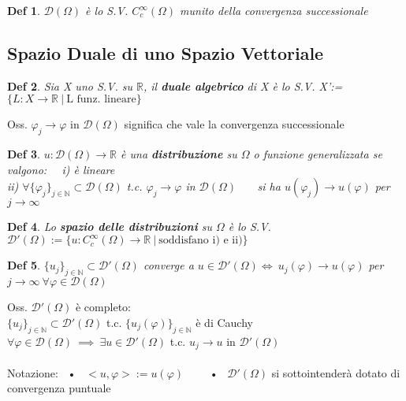 \documentclass{article}
\theoremstyle{unnumbered}
\newtheorem* {theoremT}{Def}
\theoremstyle{unnumbered1}
\newenvironment{defi}{\begin{gBox}\begin{theoremT}}{\end{theoremT}\end{gBox}}
\renewcommand{\phi}{\varphi}
\begin{document}
\begin{defi}
$\mathcal{D}(\Omega)$ è lo S.V. $C^{\infty}_c(\Omega)$ munito della convergenza successionale
\end{defi}
\vspace{0.2cm}

\subsection{Spazio Duale di uno Spazio Vettoriale}

\begin{defi}
Sia X uno S.V. su $\mathbb{R}$, il \textbf{duale algebrico} di X è lo S.V. X':=$\{ L:X\to \mathbb{R} \ |\ \text{L funz. lineare} \}$ 
\end{defi}
%
Oss. $\phi_j\to\phi$ in $\mathcal{D}(\Omega)$ significa che vale la convergenza successionale 

\begin{defi}
$u:\mathcal{D}(\Omega)\to\mathbb{R}$ è una \textbf{distribuzione} su $\Omega$ o funzione generalizzata se valgono: \ \ i) è lineare\\
ii) $\forall \{\phi_j\}_{j\in\mathbb{N}}\subset\mathcal{D}(\Omega)$ t.c. $\phi_j\to\phi$ in $\mathcal{D}(\Omega)$ \ \ \ si ha $u(\phi_j)\to u(\phi)$ per $j\to\infty$
\end{defi}

\begin{defi}
Lo \textbf{spazio delle distribuzioni} su $\Omega$ è lo S.V. \ $\mathcal{D}'(\Omega):=\{u: C^{\infty}_c(\Omega)\to\mathbb{R} \ | \ \text{soddisfano i) e ii)}\}$
\end{defi}

\begin{defi}
$\{u_j\}_{j\in\mathbb{N}}\subset\mathcal{D}'(\Omega)$ converge a $u\in\mathcal{D}'(\Omega) \Longleftrightarrow \ u_j(\phi)\to u(\phi)$ per $j\to\infty \ \forall \phi \in \mathcal{D}(\Omega)$   
\end{defi}
%
Oss. $\mathcal{D}'(\Omega)$ è completo: \\
$\{u_j\}_{j\in\mathbb{N}}\subset\mathcal{D}'(\Omega)$ t.c. $\{u_j(\phi)\}_{j\in\mathbb{N}}$ è di Cauchy $\forall \phi\in\mathcal{D}(\Omega) \ \implies \ \exists u\in\mathcal{D}'(\Omega)$ t.c. $u_j\to u$ in $\mathcal{D}'(\Omega)$\\ \\ 
%
Notazione: \ • \ $<u,\phi>:=u(\phi)$ \ \ \ \ • \  $\mathcal{D}'(\Omega)$ si sottointenderà  dotato di convergenza puntuale   \\
\end{document}
